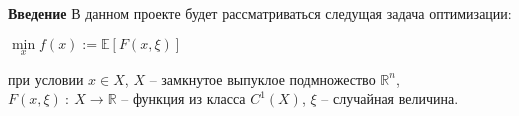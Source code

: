 \documentclass[oneside,final,12pt]{article}
\begin{document}
\noindent\textbf{\Large{Введение}}\newline\break
В данном проекте будет рассматриваться следущая задача оптимизации:\newline
\centerline{$\min\limits_{x} f(x) := \mathbb{E}[F(x, \xi)]$}\newline
при условии $x\in X$, $X$ -- замкнутое выпуклое подмножество $\mathbb{R}^n$, $F(x, \xi)\ :\ X \to \mathbb{R}$ -- функция из класса $C^1(X)$, $\xi$ -- случайная величина.\newline
\end{document}
